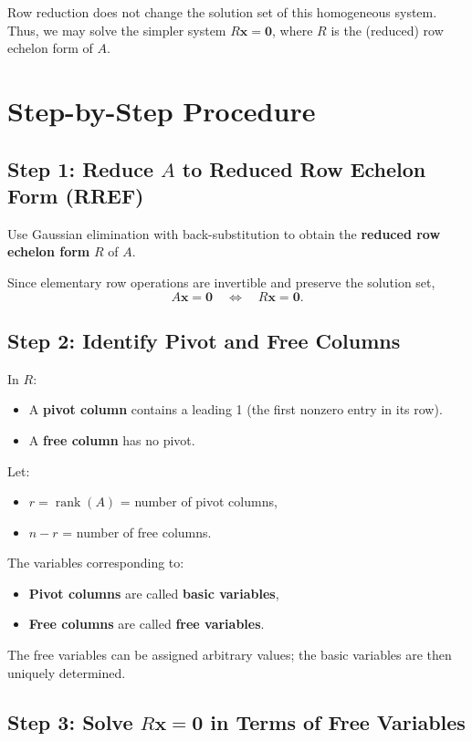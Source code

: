 \documentclass{article}
\begin{document}
Row reduction does not change the solution set of this homogeneous system. Thus, we may solve the simpler system $R\mathbf{x} = \mathbf{0}$, where $R$ is the (reduced) row echelon form of $A$.

\section*{Step-by-Step Procedure}

\subsection*{Step 1: Reduce $A$ to Reduced Row Echelon Form (RREF)}

Use Gaussian elimination with back-substitution to obtain the \textbf{reduced row echelon form} $R$ of $A$.

Since elementary row operations are invertible and preserve the solution set,
\[
A\mathbf{x} = \mathbf{0} \quad \Longleftrightarrow \quad R\mathbf{x} = \mathbf{0}.
\]

\subsection*{Step 2: Identify Pivot and Free Columns}

In $R$:
\begin{itemize}
\item A \textbf{pivot column} contains a leading 1 (the first nonzero entry in its row).
    \item A \textbf{free column} has no pivot.
\end{itemize}
Let:
\begin{itemize}
\item $r = \operatorname{rank}(A)$ = number of pivot columns,
    \item $n - r$ = number of free columns.
\end{itemize}

The variables corresponding to:
\begin{itemize}
\item \textbf{Pivot columns} are called \textbf{basic variables},
    \item \textbf{Free columns} are called \textbf{free variables}.
\end{itemize}

The free variables can be assigned arbitrary values; the basic variables are then uniquely determined.

\subsection*{Step 3: Solve $R\mathbf{x} = \mathbf{0}$ in Terms of Free Variables}
\end{document}
